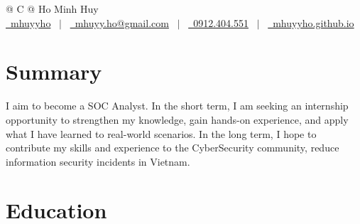 \documentclass[a4paper,12pt]{article}
\begin{document}
\pagestyle{empty} 



\begin{tabularx}{\linewidth}{@{} C @{}}
\Huge{Ho Minh Huy} \\[7.5pt]
\href{https://github.com/username}{\raisebox{-0.05\height}\faGithub\ mhuyyho} \ $|$ \ 
\href{mailto:mhuyy.ho@gmail.com}{\raisebox{-0.05\height}\faEnvelope\ mhuyy.ho@gmail.com} \ $|$ \ 
\href{tel:0912404551}{\raisebox{-0.05\height}\faMobile\ 0912.404.551} \ $|$ \ 
\href{https://mhuyyho.github.io/about/}{\raisebox{-0.05\height}\faGlobe\ mhuyyho.github.io} \\
\end{tabularx}


\section{Summary}
I aim to become a SOC Analyst. In the short term, I am seeking an internship opportunity to strengthen my knowledge, gain hands-on experience, and apply what I have learned to real-world scenarios. In the long term, I hope to contribute my skills and experience to the CyberSecurity community, reduce information security incidents in Vietnam.

\section{Education}
\end{document}
